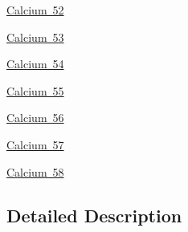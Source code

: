 \begin{DoxyCompactItemize}
\item 
\mbox{\hyperlink{group___isotope_const-_calcium-_ca52}{Calcium 52}}
\item 
\mbox{\hyperlink{group___isotope_const-_calcium-_ca53}{Calcium 53}}
\item 
\mbox{\hyperlink{group___isotope_const-_calcium-_ca54}{Calcium 54}}
\item 
\mbox{\hyperlink{group___isotope_const-_calcium-_ca55}{Calcium 55}}
\item 
\mbox{\hyperlink{group___isotope_const-_calcium-_ca56}{Calcium 56}}
\item 
\mbox{\hyperlink{group___isotope_const-_calcium-_ca57}{Calcium 57}}
\item 
\mbox{\hyperlink{group___isotope_const-_calcium-_ca58}{Calcium 58}}
\end{DoxyCompactItemize}


\subsection{Detailed Description}
